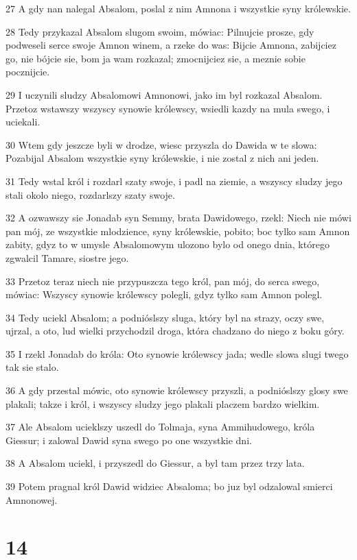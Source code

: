 \par 27 A gdy nan nalegal Absalom, poslal z nim Amnona i wszystkie syny królewskie.
\par 28 Tedy przykazal Absalom slugom swoim, mówiac: Pilnujcie prosze, gdy podweseli serce swoje Amnon winem, a rzeke do was: Bijcie Amnona, zabijciez go, nie bójcie sie, bom ja wam rozkazal; zmocnijciez sie, a meznie sobie pocznijcie.
\par 29 I uczynili sludzy Absalomowi Amnonowi, jako im byl rozkazal Absalom. Przetoz wstawszy wszyscy synowie królewscy, wsiedli kazdy na mula swego, i uciekali.
\par 30 Wtem gdy jeszcze byli w drodze, wiesc przyszla do Dawida w te slowa: Pozabijal Absalom wszystkie syny królewskie, i nie zostal z nich ani jeden.
\par 31 Tedy wstal król i rozdarl szaty swoje, i padl na ziemie, a wszyscy sludzy jego stali okolo niego, rozdarlszy szaty swoje.
\par 32 A ozwawszy sie Jonadab syn Semmy, brata Dawidowego, rzekl: Niech nie mówi pan mój, ze wszystkie mlodzience, syny królewskie, pobito; boc tylko sam Amnon zabity, gdyz to w umysle Absalomowym ulozono bylo od onego dnia, którego zgwalcil Tamare, siostre jego.
\par 33 Przetoz teraz niech nie przypuszcza tego król, pan mój, do serca swego, mówiac: Wszyscy synowie królewscy polegli, gdyz tylko sam Amnon polegl.
\par 34 Tedy uciekl Absalom; a podnióslszy sluga, który byl na strazy, oczy swe, ujrzal, a oto, lud wielki przychodzil droga, która chadzano do niego z boku góry.
\par 35 I rzekl Jonadab do króla: Oto synowie królewscy jada; wedle slowa slugi twego tak sie stalo.
\par 36 A gdy przestal mówic, oto synowie królewscy przyszli, a podnióslszy glosy swe plakali; takze i król, i wszyscy sludzy jego plakali placzem bardzo wielkim.
\par 37 Ale Absalom ucieklszy uszedl do Tolmaja, syna Ammihudowego, króla Giessur; i zalowal Dawid syna swego po one wszystkie dni.
\par 38 A Absalom uciekl, i przyszedl do Giessur, a byl tam przez trzy lata.
\par 39 Potem pragnal król Dawid widziec Absaloma; bo juz byl odzalowal smierci Amnonowej.

\chapter{14}

